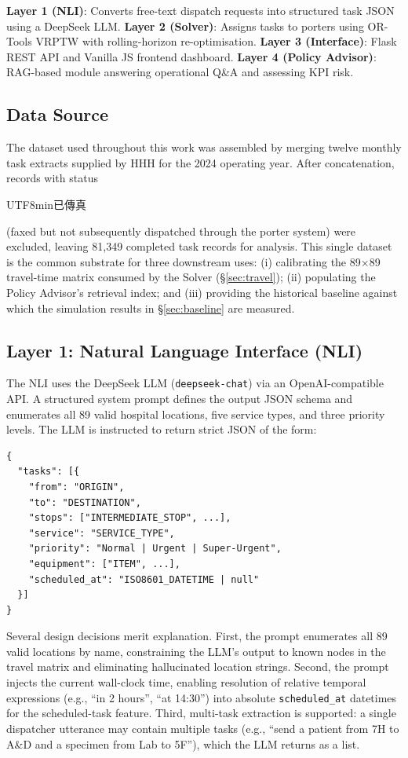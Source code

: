 \documentclass[12pt,a4paper]{article}
\begin{document}
\textbf{Layer 1 (NLI)}: Converts free-text dispatch requests into structured task JSON using a DeepSeek LLM. \textbf{Layer 2 (Solver)}: Assigns tasks to porters using OR-Tools VRPTW with rolling-horizon re-optimisation. \textbf{Layer 3 (Interface)}: Flask REST API and Vanilla JS frontend dashboard. \textbf{Layer 4 (Policy Advisor)}: RAG-based module answering operational Q\&A and assessing KPI risk.

\subsection{Data Source}

The  dataset used throughout this work was assembled by merging twelve monthly task extracts supplied by HHH for the 2024 operating year. After concatenation, records with status \begin{CJK}{UTF8}{min}已傳真\end{CJK} (faxed but not subsequently dispatched through the porter system) were excluded, leaving 81,349 completed task records for analysis. This single dataset is the common substrate for three downstream uses: (i) calibrating the 89$\times$89 travel-time matrix consumed by the Solver (\S\ref{sec:travel}); (ii) populating the Policy Advisor's retrieval index; and (iii) providing the historical baseline against which the simulation results in \S\ref{sec:baseline} are measured.

\subsection{Layer 1: Natural Language Interface (NLI)}

The NLI uses the DeepSeek LLM (\texttt{deepseek-chat}) via an OpenAI-compatible API. A structured system prompt defines the output JSON schema and enumerates all 89 valid hospital locations, five service types, and three priority levels. The LLM is instructed to return strict JSON of the form:

\begin{verbatim}
{
  "tasks": [{
    "from": "ORIGIN",
    "to": "DESTINATION",
    "stops": ["INTERMEDIATE_STOP", ...],
    "service": "SERVICE_TYPE",
    "priority": "Normal | Urgent | Super-Urgent",
    "equipment": ["ITEM", ...],
    "scheduled_at": "ISO8601_DATETIME | null"
  }]
}
\end{verbatim}

Several design decisions merit explanation. First, the prompt enumerates all 89 valid locations by name, constraining the LLM's output to known nodes in the travel matrix and eliminating hallucinated location strings. Second, the prompt injects the current wall-clock time, enabling resolution of relative temporal expressions (e.g., ``in 2 hours'', ``at 14:30'') into absolute \texttt{scheduled\_at} datetimes for the scheduled-task feature. Third, multi-task extraction is supported: a single dispatcher utterance may contain multiple tasks (e.g., ``send a patient from 7H to A\&D and a specimen from Lab to 5F''), which the LLM returns as a list.
\end{document}
